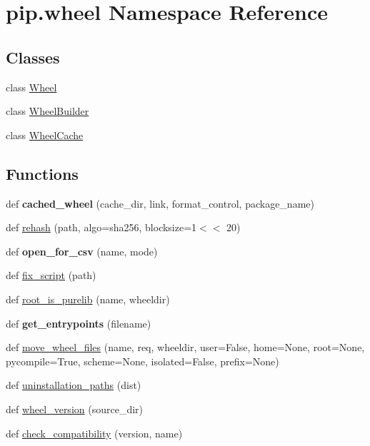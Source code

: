 \hypertarget{namespacepip_1_1wheel}{}\section{pip.\+wheel Namespace Reference}
\label{namespacepip_1_1wheel}
\subsection*{Classes}
\begin{DoxyCompactItemize}
\item 
class \hyperlink{classpip_1_1wheel_1_1_wheel}{Wheel}
\item 
class \hyperlink{classpip_1_1wheel_1_1_wheel_builder}{Wheel\+Builder}
\item 
class \hyperlink{classpip_1_1wheel_1_1_wheel_cache}{Wheel\+Cache}
\end{DoxyCompactItemize}
\subsection*{Functions}
\begin{DoxyCompactItemize}
\item 
\mbox{\label{namespacepip_1_1wheel_a9bfcdaefde0bb0e8511e85af5dac1a45}} 
def {\bfseries cached\+\_\+wheel} (cache\+\_\+dir, link, format\+\_\+control, package\+\_\+name)
\item 
def \hyperlink{namespacepip_1_1wheel_a9a0d61b894cb798929ca0187950e30fe}{rehash} (path, algo=\textquotesingle{}sha256\textquotesingle{}, blocksize=1$<$$<$ 20)
\item 
\mbox{\label{namespacepip_1_1wheel_acc0e6d9244775e3aa07c6e25e0516449}} 
def {\bfseries open\+\_\+for\+\_\+csv} (name, mode)
\item 
def \hyperlink{namespacepip_1_1wheel_a599a39423d9d0b31026681b5715446b8}{fix\+\_\+script} (path)
\item 
def \hyperlink{namespacepip_1_1wheel_acc591f6768fbe320deb0417b1163f43f}{root\+\_\+is\+\_\+purelib} (name, wheeldir)
\item 
\mbox{\label{namespacepip_1_1wheel_a9be696d657b7656d25318798472119a1}} 
def {\bfseries get\+\_\+entrypoints} (filename)
\item 
def \hyperlink{namespacepip_1_1wheel_a922fc81dd2fead488599fcb9aa3bd810}{move\+\_\+wheel\+\_\+files} (name, req, wheeldir, user=False, home=None, root=None, pycompile=True, scheme=None, isolated=False, prefix=None)
\item 
def \hyperlink{namespacepip_1_1wheel_a43b1d222c327f5a2fd315a497ab74c44}{uninstallation\+\_\+paths} (dist)
\item 
def \hyperlink{namespacepip_1_1wheel_a73536b9b31527a08e3b7933fb6ccc7c3}{wheel\+\_\+version} (source\+\_\+dir)
\item 
def \hyperlink{namespacepip_1_1wheel_a4f43de549d71ed87fd2c9e19756bc3cd}{check\+\_\+compatibility} (version, name)
\end{DoxyCompactItemize}
